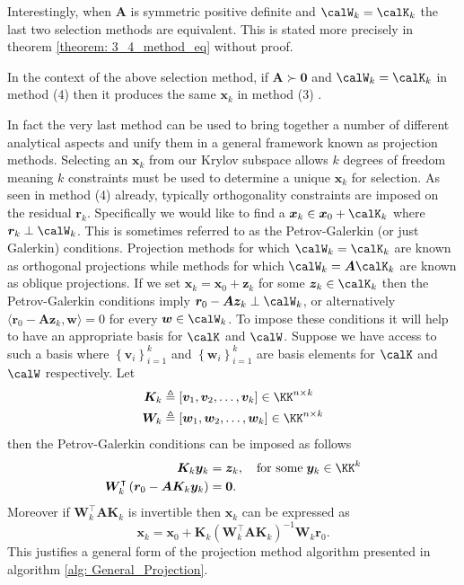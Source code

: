 Interestingly, when $\bm{A}$ is symmetric positive definite and $\calW_k = \calK_k$ the last two selection methods are equivalent. This is stated more precisely in theorem \ref{theorem: 3_4_method_eq} without proof.

\begin{thm} \label{theorem: 3_4_method_eq}
    In the context of the above selection method, if $\bm{A} \succ \bm{0}$ and $\calW_k = \calK_k$ in method (4) then it produces the same $\bm{x}_k$ in method (3) \cite{DemmelJamesW1997Anla}.
\end{thm}

In fact the very last method can be used to bring together a number of different analytical aspects and unify them in a general framework known as projection methods. Selecting an $\bm{x}_k$ from our Krylov subspace allows $k$ degrees of freedom meaning $k$ constraints must be used to determine a unique $\bm{x}_k$ for selection. As seen in method (4) already, typically orthogonality constraints are imposed on the residual $\bm{r}_k$. Specifically we would like to find a $\bm{x}_k \in \bm{x}_0 + \calK_k$ where $\bm{r}_k \perp \calW_k$. This is sometimes referred to as the Petrov-Galerkin (or just Galerkin) conditions. Projection methods for which $\calW_k = \calK_k$ are known as orthogonal projections while methods for which $\calW_k = \bm{A} \calK_k$ are known as oblique projections. If we set $\bm{x}_k = \bm{x}_0 + \bm{z}_k$ for some $\bm{z}_k \in \calK_k$ then the Petrov-Galerkin conditions imply $\bm{r}_0 - \bm{A} \bm{z}_k \perp \calW_k$, or alternatively $\langle \bm{r}_0 - \bm{A} \bm{z}_k , \bm{w} \rangle = 0$ for every $\bm{w} \in \calW_k$. To impose these conditions it will help to have an appropriate basis for $\calK$ and $\calW$. Suppose we have access to such a basis where $\left\{ \bm{v}_i \right\}_{i=1}^{k}$ and $\left\{ \bm{w}_i \right\}_{i=1}^{k}$ are basis elements for $\calK$ and $\calW$ respectively. Let
\begin{align*}
    \bm{K}_k & \triangleq \left[ \bm{v}_1 , \bm{v}_2 , \ldots , \bm{v}_k \right] \in \KK^{n \times k} \\
    \bm{W}_k & \triangleq \left[ \bm{w}_1 , \bm{w}_2 , \ldots , \bm{w}_k \right] \in \KK^{n \times k}
\end{align*}
then the Petrov-Galerkin conditions can be imposed as follows
\begin{align*}
    \bm{K}_k \bm{y}_k                                                       & = \bm{z}_k , \quad \text{for some} \; \bm{y}_k \in \KK^k \\
    \bm{W}_k^{\intercal} \left( \bm{r}_0 - \bm{A} \bm{K}_k \bm{y}_k \right) & = \bm{0}.
\end{align*}
Moreover if $\bm{W}_k^{\intercal} \bm{A} \bm{K}_k$ is invertible then $\bm{x}_k$ can be expressed as
\begin{equation} \label{eq: expr_x_Petrov_Galerkin_1}
    \bm{x}_k = \bm{x}_0 + \bm{K}_k \left( \bm{W}_k^{\intercal} \bm{A} \bm{K}_k \right)^{-1} \bm{W}_k \bm{r}_0.
\end{equation}
This justifies a general form of the projection method algorithm presented in algorithm \ref{alg: General_Projection}.

